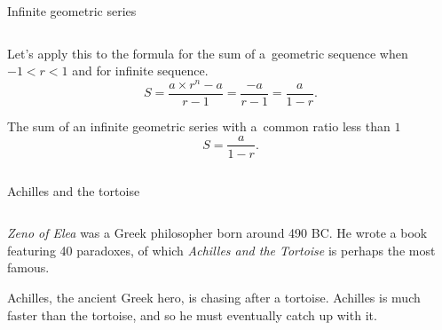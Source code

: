 \documentclass[9pt,aspectratio=169]{beamer}
\begin{document}
\begin{frame}{Infinite geometric series}
\begin{columns}[T]
\begin{column}{0.5\textwidth}
      Let’s apply this to the formula for the sum of a~geometric sequence when $-1 < r < 1$ and for infinite sequence.
      \[ S = \frac{a \times r^n - a}{r - 1} = \frac{-a}{r - 1} = \frac{a}{1 - r}. \]
      \begin{definition}
        The sum of an infinite geometric series with a~common ratio less than $1$ 
        \[ S = \frac{a}{1 - r}. \]
        \vspace*{-0.5em}
      \end{definition}
    \end{column}
  \end{columns}
\end{frame}

\begin{frame}{Achilles and the tortoise}
  \begin{columns}[T]
    \begin{column}{0.5\textwidth}
      \emph{Zeno of Elea} was a Greek philosopher born around 490 BC.  He wrote a book featuring 40 paradoxes, of which \emph{Achilles and the Tortoise} is perhaps the most famous.
      
      Achilles, the ancient Greek hero, is chasing after a tortoise. Achilles is much faster than the tortoise, and so he must eventually catch up with it. 
      

\end{column}
\end{columns}
\end{frame}
\end{document}
